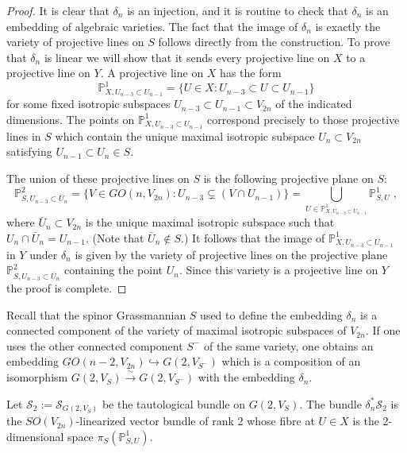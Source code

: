 \documentclass[12pt]{amsart}
\def\PP {{\mathbb P}}     %
\def\hw  {\hookrightarrow}
\def\mc {\mathcal}
\begin{document}
\begin{proof}
It is clear that $\delta_n$ is an injection, and it is routine to check that $\delta_n$ is an embedding of algebraic varieties. The fact that the image of $\delta_n$ is exactly the variety of projective lines on $S$ follows directly from the construction. To prove that $\delta_n$ is linear we will show that it sends every projective line on $X$ to a projective line on $Y$. A projective line on $X$ has the form
$$
\PP^1_{X,U_{n-3}\subset U_{n-1}}=\{U\in X: U_{n-3}\subset U\subset U_{n-1}\}
$$
for some fixed isotropic subspaces $U_{n-3}\subset U_{n-1}\subset V_{2n}$ of the indicated dimensions. The points on $\PP^1_{X,U_{n-3}\subset U_{n-1}}$ correspond precisely to those projective lines in $S$ which contain the unique maximal isotropic subspace $U_n\subset V_{2n}$ satisfying $U_{n-1}\subset U_n\in S$.

The union of these projective lines on $S$ is the following projective plane on $S$:
$$
\PP^2_{S,U_{n-3}\subset \bar U_{n}}= \{V\in GO(n,V_{2n}): U_{n-3}\subsetneq (V\cap U_{n-1})\} = \bigcup\limits_{U\in \PP^1_{X,U_{n-3}\subset U_{n-1}}} \PP^1_{S,U}\;,
$$
where $\bar U_{n}\subset V_{2n}$ is the unique maximal isotropic subspace such that $U_n\cap\bar U_n=U_{n-1}$. (Note that $\bar U_n\notin S$.) It follows that the image of $\PP^1_{X,U_{n-3}\subset U_{n-1}}$ in $Y$ under $\delta_n$ is given by the variety of projective lines on the projective plane $\PP^2_{S,U_{n-3}\subset \bar U_{n}}$ containing the point $U_n$. Since this variety is a projective line on $Y$ the proof is complete.
\end{proof}

Recall that the spinor Grassmannian $S$ used to define the embedding $\delta_n$ is a connected component of the variety of maximal isotropic subspaces of $V_{2n}$. If one uses the other connected component $S^-$ of the same variety, one obtains an embedding $GO(n-2,V_{2n})\hw G(2,V_{S^-})$ which is a composition of an isomorphism $G(2,V_{S})\stackrel{\sim}\to G(2,V_{S^-})$ with the embedding $\delta_n$.


Let $\mc S_2:=\mc S_{G(2,V_S)}$ be the tautological bundle on $G(2,V_S)$. The bundle $\delta_n^*\mc S_2$ is the $SO(V_{2n})$-linearized vector bundle of rank 2 whose fibre at $U\in X$ is the 2-dimensional space $\pi_S(\PP^1_{S,U})$.
\end{document}
